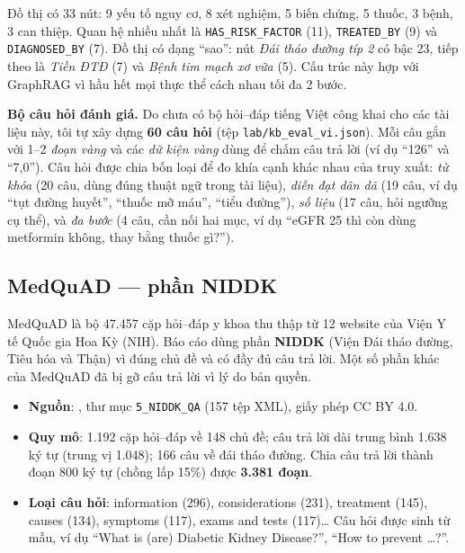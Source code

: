 
Đồ thị có 33 nút: 9 yếu tố nguy cơ, 8 xét nghiệm, 5 biến chứng, 5 thuốc, 3 bệnh, 3 can thiệp. Quan hệ nhiều nhất là \texttt{HAS\_RISK\_FACTOR} (11), \texttt{TREATED\_BY} (9) và \texttt{DIAGNOSED\_BY} (7). Đồ thị có dạng ``sao'': nút \emph{Đái tháo đường típ 2} có bậc 23, tiếp theo là \emph{Tiền ĐTĐ} (7) và \emph{Bệnh tim mạch xơ vữa} (5). Cấu trúc này hợp với GraphRAG vì hầu hết mọi thực thể cách nhau tối đa 2 bước.

\textbf{Bộ câu hỏi đánh giá.} Do chưa có bộ hỏi–đáp tiếng Việt công khai cho các tài liệu này, tôi tự xây dựng \textbf{60 câu hỏi} (tệp \texttt{lab/kb\_eval\_vi.json}). Mỗi câu gắn với 1–2 \emph{đoạn vàng} và các \emph{dữ kiện vàng} dùng để chấm câu trả lời (ví dụ ``126'' và ``7,0''). Câu hỏi được chia bốn loại để đo khía cạnh khác nhau của truy xuất: \emph{từ khóa} (20 câu, dùng đúng thuật ngữ trong tài liệu), \emph{diễn đạt dân dã} (19 câu, ví dụ ``tụt đường huyết'', ``thuốc mỡ máu'', ``tiểu đường''), \emph{số liệu} (17 câu, hỏi ngưỡng cụ thể), và \emph{đa bước} (4 câu, cần nối hai mục, ví dụ ``eGFR 25 thì còn dùng metformin không, thay bằng thuốc gì?'').

\subsection{MedQuAD — phần NIDDK}

MedQuAD \cite{benabacha2019} là bộ 47.457 cặp hỏi–đáp y khoa thu thập từ 12 website của Viện Y tế Quốc gia Hoa Kỳ (NIH). Báo cáo dùng phần \textbf{NIDDK} (Viện Đái tháo đường, Tiêu hóa và Thận) vì đúng chủ đề và có đầy đủ câu trả lời. Một số phần khác của MedQuAD đã bị gỡ câu trả lời vì lý do bản quyền.

\begin{itemize}
  \item \textbf{Nguồn}: , thư mục \texttt{5\_NIDDK\_QA} (157 tệp XML), giấy phép CC BY 4.0.
  \item \textbf{Quy mô}: 1.192 cặp hỏi–đáp về 148 chủ đề; câu trả lời dài trung bình 1.638 ký tự (trung vị 1.048); 166 câu về đái tháo đường. Chia câu trả lời thành đoạn 800 ký tự (chồng lấp 15\%) được \textbf{3.381 đoạn}.
  \item \textbf{Loại câu hỏi}: information (296), considerations (231), treatment (145), causes (134), symptoms (117), exams and tests (117)\ldots{} Câu hỏi được sinh từ mẫu, ví dụ ``What is (are) Diabetic Kidney Disease?'', ``How to prevent \ldots?''.
\end{itemize}

